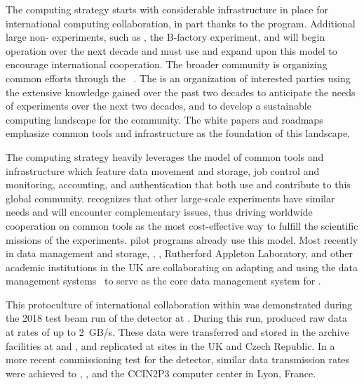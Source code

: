 The  computing strategy starts with considerable infrastructure in place for international computing collaboration, in part thanks to the  program.  Additional large non- experiments,  such as , the  B-factory experiment, and   will begin operation over the next decade and must use and expand upon this model to encourage international cooperation.  The broader  community is organizing common efforts through the ~\cite{Alves:2017she}.  The  is an organization of interested parties using the extensive knowledge gained over the past two decades to anticipate the needs of experiments over the next two decades, and to develop a sustainable computing landscape for the  community.  The  white papers and roadmaps emphasize common tools and infrastructure as the foundation of this landscape.

The  computing strategy heavily leverages the  model of common tools and infrastructure which feature data movement and storage, job control and monitoring, accounting, and authentication that both use and contribute to this global community.    recognizes that other large-scale experiments have similar needs and will encounter complementary issues, thus driving worldwide cooperation on common tools as the most cost-effective way to fulfill the scientific missions of the experiments.   pilot programs already use this model.  Most recently in data management and storage, , , Rutherford Appleton Laboratory, and other academic institutions in the %
UK are collaborating on adapting and using the  data management systems~\cite{Barisits:2019fyl}  to serve as the core data management system for .

This protoculture of international collaboration within  %
was demonstrated during the 2018 test beam run of the  detector  at .  During this run, %
 produced raw data at rates of up to \SI{2}{GB/s}.  These data were transferred and stored in the archive facilities at  and , and replicated at sites in the UK and Czech Republic.  In a more recent commissioning test for the  detector, similar data transmission rates %
were achieved to , , and the CCIN2P3 computer center in Lyon, France.

